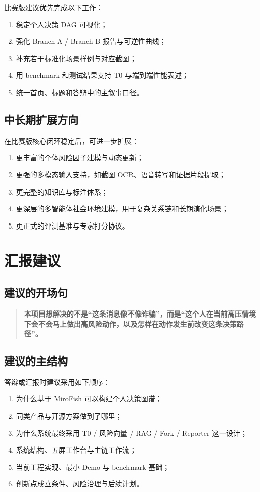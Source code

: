 \documentclass[12pt,a4paper]{ctexart}
\begin{document}
比赛版建议优先完成以下工作：
\begin{enumerate}[leftmargin=2em]
  \item 稳定个人决策 DAG 可视化；
  \item 强化 Branch A / Branch B 报告与可逆性曲线；
  \item 补充若干标准化场景样例与对应截图；
  \item 用 benchmark 和测试结果支持 T0 与端到端性能表述；
  \item 统一首页、标题和答辩中的主叙事口径。
\end{enumerate}

\subsection{中长期扩展方向}

在比赛版核心闭环稳定后，可进一步扩展：
\begin{enumerate}[leftmargin=2em]
  \item 更丰富的个体风险因子建模与动态更新；
  \item 更强的多模态输入支持，如截图 OCR、语音转写和证据片段提取；
  \item 更完整的知识库与标注体系；
  \item 更深层的多智能体社会环境建模，用于复杂关系链和长期演化场景；
  \item 更正式的评测基准与专家打分协议。
\end{enumerate}

\section{汇报建议}

\subsection{建议的开场句}

\begin{quote}
\textbf{本项目想解决的不是“这条消息像不像诈骗”，而是“这个人在当前高压情境下会不会马上做出高风险动作，以及怎样在动作发生前改变这条决策路径”。}
\end{quote}

\subsection{建议的主结构}

答辩或汇报时建议采用如下顺序：
\begin{enumerate}[leftmargin=2em]
  \item 为什么基于 MiroFish 可以构建个人决策图谱；
  \item 同类产品与开源方案做到了哪里；
  \item 为什么系统最终采用 T0 / 风险向量 / RAG / Fork / Reporter 这一设计；
  \item 系统结构、五屏工作台与主链工作流；
  \item 当前工程实现、最小 Demo 与 benchmark 基础；
  \item 创新点成立条件、风险治理与后续计划。
\end{enumerate}
\end{document}
